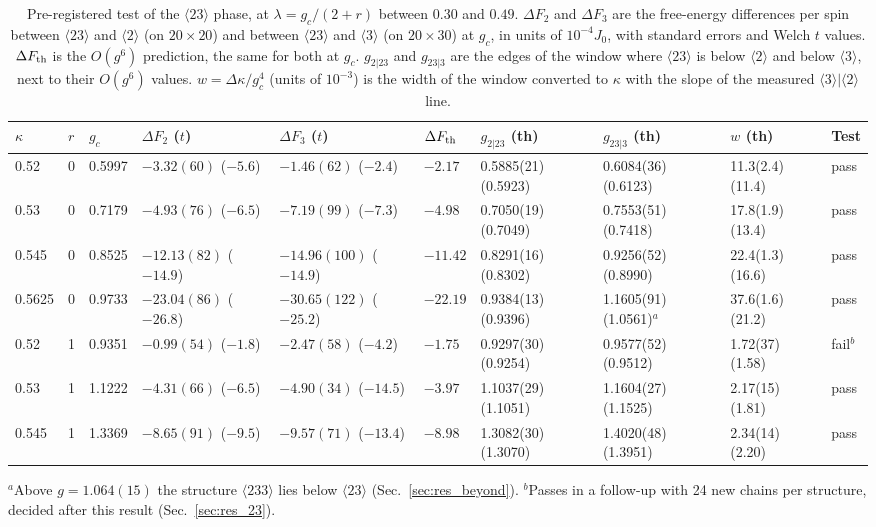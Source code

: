\documentclass[
 aps,prb,
 twocolumn,
 superscriptaddress,
 longbibliography,
 nofootinbib,
 floatfix
]{revtex4-2}
\begin{document}
\begin{table}
\caption{Pre-registered test of the $\langle23\rangle$ phase, at $\lambda=g_c/(2+r)$ between $0.30$ and $0.49$. $\Delta F_2$ and $\Delta F_3$
are the free-energy differences per spin between $\langle23\rangle$ and $\langle2\rangle$ (on $20\times20$) and
between $\langle23\rangle$ and $\langle3\rangle$ (on $20\times30$) at $g_c$, in units of $10^{-4}J_0$, with standard
errors and Welch $t$ values. $\Delta F_{\rm th}$ is the $O(g^6)$ prediction, the same for both at $g_c$.
$g_{2|23}$ and $g_{23|3}$ are the edges of the window where $\langle23\rangle$ is below $\langle2\rangle$ and
below $\langle3\rangle$, next to their $O(g^6)$ values. $w=\Delta\kappa/g_c^4$ (units of $10^{-3}$) is the width of the
window converted to $\kappa$ with the slope of the measured $\langle3\rangle|\langle2\rangle$ line.}
\label{tab:s5a}
\footnotesize\setlength{\tabcolsep}{3pt}
\begin{ruledtabular}
\begin{tabular}{llllllllll}
$\kappa$ & $r$ & $g_c$ & $\Delta F_2$ ($t$) & $\Delta F_3$ ($t$) & $\Delta F_{\rm th}$ &
$g_{2|23}$ (th) & $g_{23|3}$ (th) & $w$ (th) & Test \\
\hline
0.52   & 0 & 0.5997 & $-3.32(60)$ ($-5.6$)  & $-1.46(62)$ ($-2.4$)  & $-2.17$  & 0.5885(21) (0.5923) & 0.6084(36) (0.6123) & 11.3(2.4) (11.4) & pass \\
0.53   & 0 & 0.7179 & $-4.93(76)$ ($-6.5$)  & $-7.19(99)$ ($-7.3$)  & $-4.98$  & 0.7050(19) (0.7049) & 0.7553(51) (0.7418) & 17.8(1.9) (13.4) & pass \\
0.545  & 0 & 0.8525 & $-12.13(82)$ ($-14.9$) & $-14.96(100)$ ($-14.9$) & $-11.42$ & 0.8291(16) (0.8302) & 0.9256(52) (0.8990) & 22.4(1.3) (16.6) & pass \\
0.5625 & 0 & 0.9733 & $-23.04(86)$ ($-26.8$) & $-30.65(122)$ ($-25.2$) & $-22.19$ & 0.9384(13) (0.9396) & 1.1605(91) (1.0561)$^a$ & 37.6(1.6) (21.2) & pass \\
0.52   & 1 & 0.9351 & $-0.99(54)$ ($-1.8$)  & $-2.47(58)$ ($-4.2$)  & $-1.75$  & 0.9297(30) (0.9254) & 0.9577(52) (0.9512) & 1.72(37) (1.58) & fail$^b$ \\
0.53   & 1 & 1.1222 & $-4.31(66)$ ($-6.5$)  & $-4.90(34)$ ($-14.5$) & $-3.97$  & 1.1037(29) (1.1051) & 1.1604(27) (1.1525) & 2.17(15) (1.81) & pass \\
0.545  & 1 & 1.3369 & $-8.65(91)$ ($-9.5$)  & $-9.57(71)$ ($-13.4$) & $-8.98$  & 1.3082(30) (1.3070) & 1.4020(48) (1.3951) & 2.34(14) (2.20) & pass \\
\end{tabular}
\end{ruledtabular}
\raggedright\footnotesize{$^a$Above $g=1.064(15)$ the structure $\langle233\rangle$ lies below $\langle23\rangle$ (Sec.~\ref{sec:res_beyond}).
$^b$Passes in a follow-up with 24 new chains per structure, decided after this result (Sec.~\ref{sec:res_23}).}
\end{table}
\end{document}
